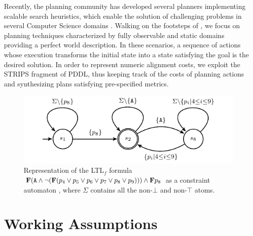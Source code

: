 Recently, the planning community has developed several planners implementing scalable search heuristics, which enable the solution of challenging problems in several Computer Science domains \cite{Marrella17}. Walking on the footsteps of \cite{MaggiMCA18}, we focus on planning techniques characterized by fully observable and static domains providing a perfect world description. In these scenarios, a sequence of actions whose execution transforms the initial state into a state satisfying the goal is the desired solution. In order to represent numeric alignment costs, we exploit the STRIPS fragment of PDDL, thus keeping track of the costs of planning actions and synthesizing plans satisfying pre-specified metrics.

\begin{figure}[!t]
	\centering
%
\includegraphics[scale=0.9]{images/example_3_graph}
	\caption{Representation of the LTL$_f$ formula $\mathbf{F}(\texttt{A}\wedge\neg(\mathbf{F}(p_4\vee p_5\vee p_6\vee p_7\vee p_8\vee p_9)))\wedge \mathbf{F} p_8$  as a constraint automaton \cite{Westergaard11}, where $\Sigma$ contains all the non-$\bot$ and non-$\top$ atoms.}
	\label{fig:g1g2}
\end{figure}

\section{Working Assumptions}\label{sec:wa}

